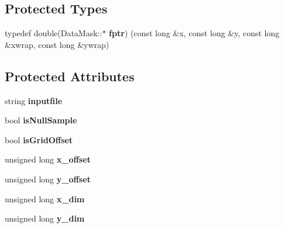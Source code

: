 \subsection*{Protected Types}
\begin{DoxyCompactItemize}
\item 
typedef double(Data\+Mask\+::$\ast$ {\bfseries fptr}) (const long \&x, const long \&y, const long \&xwrap, const long \&ywrap)\hypertarget{class_data_mask_a0ed51de5661fc3046d085e044a7efd4a}{}\label{class_data_mask_a0ed51de5661fc3046d085e044a7efd4a}

\end{DoxyCompactItemize}
\subsection*{Protected Attributes}
\begin{DoxyCompactItemize}
\item 
string {\bfseries inputfile}\hypertarget{class_data_mask_acde16cc845a6102a8b2ee0aa9b8917cb}{}\label{class_data_mask_acde16cc845a6102a8b2ee0aa9b8917cb}

\item 
bool {\bfseries is\+Null\+Sample}\hypertarget{class_data_mask_a32ba5989de78dd5a08a3b805c2d62d05}{}\label{class_data_mask_a32ba5989de78dd5a08a3b805c2d62d05}

\item 
bool {\bfseries is\+Grid\+Offset}\hypertarget{class_data_mask_a8a5d2e1724e76f785987fcb324b7ac75}{}\label{class_data_mask_a8a5d2e1724e76f785987fcb324b7ac75}

\item 
unsigned long {\bfseries x\+\_\+offset}\hypertarget{class_data_mask_a70178c907b2dc072b62f4bfb8f690823}{}\label{class_data_mask_a70178c907b2dc072b62f4bfb8f690823}

\item 
unsigned long {\bfseries y\+\_\+offset}\hypertarget{class_data_mask_ab4508058d8563d90bfc606a648cedb2f}{}\label{class_data_mask_ab4508058d8563d90bfc606a648cedb2f}

\item 
unsigned long {\bfseries x\+\_\+dim}\hypertarget{class_data_mask_aba77e907211dea06a4a52ad3036716b0}{}\label{class_data_mask_aba77e907211dea06a4a52ad3036716b0}

\item 
unsigned long {\bfseries y\+\_\+dim}\hypertarget{class_data_mask_aa2c689edd7b8bd84bb60e836aac4e378}{}\label{class_data_mask_aa2c689edd7b8bd84bb60e836aac4e378}


\end{DoxyCompactItemize}
